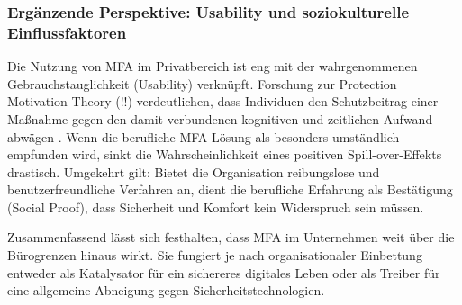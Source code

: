 \subsubsection*{Ergänzende Perspektive: Usability und soziokulturelle Einflussfaktoren}
Die Nutzung von MFA im Privatbereich ist eng mit der wahrgenommenen Gebrauchstauglichkeit (Usability) verknüpft.
Forschung zur Protection Motivation Theory (!!) verdeutlichen, dass Individuen den Schutzbeitrag einer Maßnahme gegen den damit verbundenen kognitiven und zeitlichen Aufwand abwägen \cite[S. 201]{Enhuber2023}. Wenn die berufliche MFA-Lösung als besonders umständlich empfunden wird, sinkt die Wahrscheinlichkeit eines positiven Spill-over-Effekts drastisch. 
Umgekehrt gilt: Bietet die Organisation reibungslose und benutzerfreundliche Verfahren an, dient die berufliche Erfahrung als Bestätigung ({Social Proof}), dass Sicherheit und Komfort kein Widerspruch sein müssen.

Zusammenfassend lässt sich festhalten, dass MFA im Unternehmen weit über die Bürogrenzen hinaus wirkt. Sie fungiert je nach organisationaler Einbettung entweder als Katalysator für ein sichereres digitales Leben oder als Treiber für eine allgemeine Abneigung gegen Sicherheitstechnologien.
